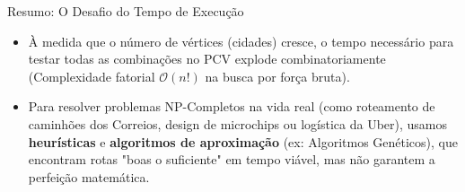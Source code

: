 \documentclass[9pt]{beamer}
\begin{document}
\begin{frame}{Resumo: O Desafio do Tempo de Execução}
    \begin{itemize}
        \item À medida que o número de vértices (cidades) cresce, o tempo necessário para testar todas as combinações no PCV explode combinatoriamente (Complexidade fatorial $\mathcal{O}(n!)$ na busca por força bruta).
        \vspace{0.3cm}
        \item Para resolver problemas NP-Completos na vida real (como roteamento de caminhões dos Correios, design de microchips ou logística da Uber), usamos \textbf{heurísticas} e \textbf{algoritmos de aproximação} (ex: Algoritmos Genéticos), que encontram rotas "boas o suficiente" em tempo viável, mas não garantem a perfeição matemática.
    \end{itemize}
\end{frame}
\end{document}
